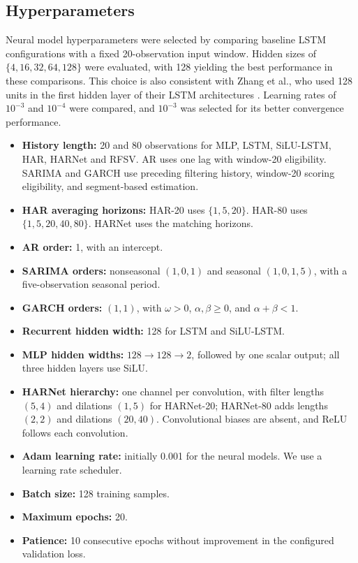 \documentclass[12pt,a4paper]{article}
\numberwithin{equation}{section}
\numberwithin{table}{section}
\numberwithin{figure}{section}
\begin{document}
\subsection{Hyperparameters}
Neural model hyperparameters were selected by comparing baseline LSTM configurations with a fixed 20-observation input window. Hidden sizes of $\{4,16,32,64,128\}$ were evaluated, with 128 yielding the best performance in these comparisons. This choice is also consistent with Zhang et al., who used 128 units in the first hidden layer of their LSTM architectures \cite{zhang2022}. Learning rates of $10^{-3}$ and $10^{-4}$ were compared, and $10^{-3}$ was selected for its better convergence performance.
\begin{itemize}
    \item \textbf{History length:} 20 and 80 observations for MLP, LSTM, SiLU-LSTM, HAR, HARNet and RFSV. AR uses one lag with window-20 eligibility. SARIMA and GARCH use preceding filtering history, window-20 scoring eligibility, and segment-based estimation. 
    \item \textbf{HAR averaging horizons:} HAR-20 uses $\{1,5,20\}$. HAR-80 uses $\{1,5,20,40,80\}$. HARNet uses the matching horizons.
    \item \textbf{AR order:} 1, with an intercept.
    \item \textbf{SARIMA orders:} nonseasonal $(1,0,1)$ and seasonal $(1,0,1,5)$, with a five-observation seasonal period.
    \item \textbf{GARCH orders:} $(1,1)$, with $\omega>0$, $\alpha,\beta\geq0$, and $\alpha+\beta<1$.
    \item \textbf{Recurrent hidden width:} 128 for LSTM and SiLU-LSTM.
    \item \textbf{MLP hidden widths:} $128\rightarrow128\rightarrow2$, followed by one scalar output; all three hidden layers use SiLU.
    \item \textbf{HARNet hierarchy:} one channel per convolution, with filter lengths $(5,4)$ and dilations $(1,5)$ for HARNet-20; HARNet-80 adds lengths $(2,2)$ and dilations $(20,40)$. Convolutional biases are absent, and ReLU follows each convolution.
    \item \textbf{Adam learning rate:} initially 0.001 for the neural models. We use a learning rate scheduler. 
    \item \textbf{Batch size:} 128 training samples.
    \item \textbf{Maximum epochs:} 20.
    \item \textbf{Patience:} 10 consecutive epochs without improvement in the configured validation loss.

\end{itemize}
\end{document}
